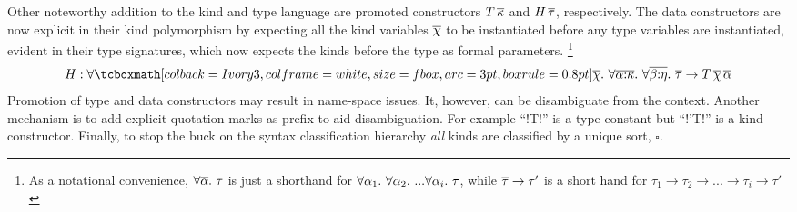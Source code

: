 \documentclass[manuscript,screen,nonacm]{acmart}
\begin{document}
Other noteworthy addition to the kind and type language are promoted constructors $T\,\overline{\kappa}$ and $H\,\overline{\tau}$, respectively. The data constructors are now explicit in their kind polymorphism by expecting all the kind variables $\overline{\chi}$ to be instantiated before any type variables are instantiated, evident in their type signatures, which now expects the kinds before the type as formal parameters.
\footnote{As a notational convenience, $\forall\overline{\alpha}.~\tau$ is just a shorthand for $\forall\alpha_1.~\forall\alpha_2.~... \forall\alpha_i.~\tau$, while $\overline{\tau} \to \tau'$ is a short hand for $\tau_1 \to \tau_2 \to ... \to \tau_i \to \tau'$
}{$$ H : \Forall {\shl{\many\chi}} {\Forall {\many{\TyVar\co\kappa}} {\Forall {\many{\beta\co\eta}} {\many\tau \to T \App\many{\chi}\App\many{\TyVar}}}} $$
}
Promotion of type and data constructors may result in name-space issues. It, however, can be disambiguate from the context. Another mechanism is to add explicit quotation marks as prefix to aid disambiguation.
For example ``!T!'' is a type constant but ``!'T!'' is a kind constructor.
Finally, to stop the buck on the syntax classification hierarchy \emph{all} kinds are classified by a unique sort, $\square$.
\end{document}
